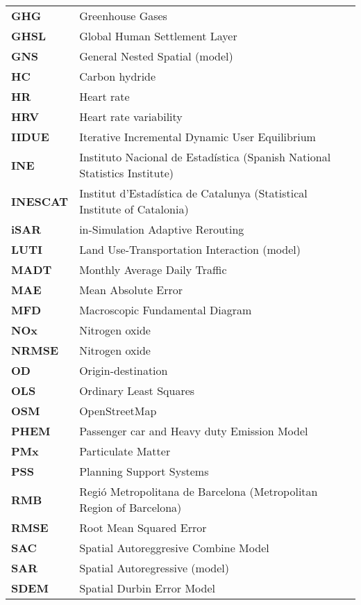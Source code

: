 \begin{tabularx}{\textwidth}{lX}
      \textbf{GHG}  & Greenhouse Gases  \\
      \textbf{GHSL}  & Global Human Settlement Layer  \\
      \textbf{GNS} &  General Nested Spatial (model) \\
      \textbf{HC}   & Carbon hydride  \\
      \textbf{HR}  &  Heart rate \\
      \textbf{HRV}  & Heart rate variability\\
      \textbf{IIDUE}  & Iterative Incremental Dynamic User Equilibrium\\
      \textbf{INE}  & Instituto Nacional de Estadística (Spanish National Statistics Institute) \\
      \textbf{INESCAT}  & Institut d’Estadística de Catalunya (Statistical Institute of Catalonia) \\
      \textbf{iSAR} & in-Simulation Adaptive Rerouting \\
      \textbf{LUTI} & Land Use-Transportation Interaction (model) \\
      \textbf{MADT} & Monthly Average Daily Traffic \\
      \textbf{MAE} & Mean Absolute Error \\
      \textbf{MFD} &  Macroscopic Fundamental Diagram \\
      \textbf{NOx}  & Nitrogen oxide  \\
      \textbf{NRMSE}  & Nitrogen oxide  \\
      \textbf{OD} &  Origin-destination\\
      \textbf{OLS} &  Ordinary Least Squares\\
      \textbf{OSM}  & OpenStreetMap   \\
      \textbf{PHEM} & Passenger car and Heavy duty Emission Model \\
      \textbf{PMx}  & Particulate Matter \\
      \textbf{PSS} & Planning Support Systems \\ 
      \textbf{RMB}  & Regió Metropolitana de Barcelona (Metropolitan Region of Barcelona) \\
      \textbf{RMSE} & Root Mean Squared Error\\
      \textbf{SAC} & Spatial Autoreggresive Combine Model \\
      \textbf{SAR}  & Spatial Autoregressive (model) \\
      \textbf{SDEM} & Spatial Durbin Error Model \\

\end{tabularx}
